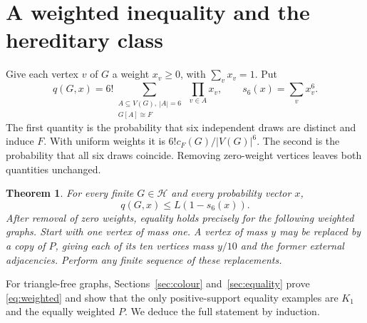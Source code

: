 \documentclass[11pt,a4paper]{article}
\newtheorem{theorem}{Theorem}
\newcommand{\BH}{\mathcal H}
\begin{document}
\section{A weighted inequality and the hereditary class}\label{sec:restricted}

Give each vertex \(v\) of \(G\) a weight \(x_v\ge0\), with \(\sum_v x_v=1\). Put
\begin{equation}\label{eq:defq}
 q(G,x)=6!\!\sum_{\substack{A\subseteq V(G),\ |A|=6\\G[A]\cong F}}\ \prod_{v\in A}x_v,
 \qquad s_6(x)=\sum_v x_v^6 .
\end{equation}
The first quantity is the probability that six independent draws are distinct and induce \(F\). With uniform weights it is \(6!c_F(G)/|V(G)|^6\). The second is the probability that all six draws coincide. Removing zero-weight vertices leaves both quantities unchanged.

\begin{theorem}\label{th:weighted}
For every finite \(G\in\BH\) and every probability vector \(x\),
\begin{equation}\label{eq:weighted}
 q(G,x)\le L(1-s_6(x)).
\end{equation}
After removal of zero weights, equality holds precisely for the following weighted graphs. Start with one vertex of mass one. A vertex of mass \(y\) may be replaced by a copy of \(P\), giving each of its ten vertices mass \(y/10\) and the former external adjacencies. Perform any finite sequence of these replacements.
\end{theorem}

For triangle-free graphs, Sections~\ref{sec:colour} and~\ref{sec:equality} prove \eqref{eq:weighted} and show that the only positive-support equality examples are \(K_1\) and the equally weighted \(P\). We deduce the full statement by induction.
\end{document}
